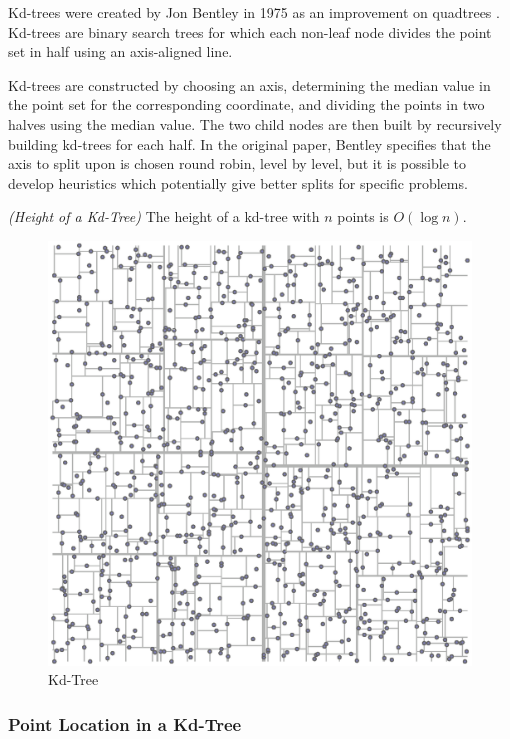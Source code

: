\documentclass[mcs]{scsthesis}
\begin{document}
Kd-trees were created by Jon Bentley in 1975 as an improvement on quadtrees
\cite{kdtree}. Kd-trees are binary search trees for which each non-leaf node
divides the point set in half using an axis-aligned line.

Kd-trees are constructed by choosing an axis, determining the median value in
the point set for the corresponding coordinate, and dividing the points in two
halves using the median value. The two child nodes are then built by
recursively building kd-trees for each half. In the original paper, Bentley
specifies that the axis to split upon is chosen round robin, level by level,
but it is possible to develop heuristics which potentially give better splits
for specific problems.

\begin{thm} \emph{(Height of a Kd-Tree)}
The height of a kd-tree with $n$ points is \(O(\log n)\).
\end{thm}

\begin{figure}
\begin{center}
\includegraphics[scale=0.35]{diagrams/kdtree.eps}
\caption{Kd-Tree}
\label{fig:kd_tree}
\end{center}
\end{figure}

\subsubsection{Point Location in a Kd-Tree}
\end{document}
